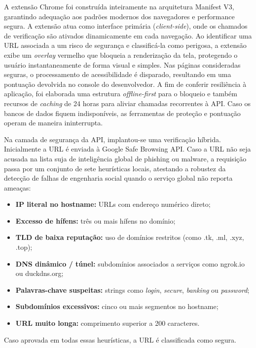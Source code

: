 \documentclass[12pt, a4paper]{article}
\begin{document}
A extensão Chrome foi construída inteiramente na arquitetura Manifest V3, garantindo adequação aos padrões modernos dos navegadores e performance segura. A extensão atua como interface primária (\textit{client-side}), onde os chamados de verificação são ativados dinamicamente em cada navegação. Ao identificar uma URL associada a um risco de segurança e classificá-la como perigosa, a extensão exibe um \textit{overlay} vermelho que bloqueia a renderização da tela, protegendo o usuário instantaneamente de forma visual e simples. Nas páginas consideradas seguras, o processamento de acessibilidade é disparado, resultando em uma pontuação devolvida no console do desenvolvedor. A fim de conferir resiliência à aplicação, foi elaborada uma estrutura \textit{offline-first} para o bloqueio e também recursos de \textit{caching} de 24 horas para aliviar chamadas recorrentes à API. Caso os bancos de dados fiquem indisponíveis, as ferramentas de proteção e pontuação operam de maneira ininterrupta.

Na camada de segurança da API, implantou-se uma verificação híbrida. Inicialmente a URL é enviada à Google Safe Browsing API. Caso a URL não seja acusada na lista suja de inteligência global de phishing ou malware, a requisição passa por um conjunto de sete heurísticas locais, atestando a robustez da detecção de falhas de engenharia social quando o serviço global não reporta ameaças:

\begin{itemize}[noitemsep]
    \item \textbf{IP literal no hostname:} URLs com endereço numérico direto;
    \item \textbf{Excesso de hífens:} três ou mais hífens no domínio;
    \item \textbf{TLD de baixa reputação:} uso de domínios restritos (como .tk, .ml, .xyz, .top);
    \item \textbf{DNS dinâmico / túnel:} subdomínios associados a serviços como ngrok.io ou duckdns.org;
    \item \textbf{Palavras-chave suspeitas:} strings como \textit{login}, \textit{secure}, \textit{banking} ou \textit{password};
    \item \textbf{Subdomínios excessivos:} cinco ou mais segmentos no hostname;
    \item \textbf{URL muito longa:} comprimento superior a 200 caracteres.
\end{itemize}

Caso aprovada em todas essas heurísticas, a URL é classificada como segura.
\end{document}
